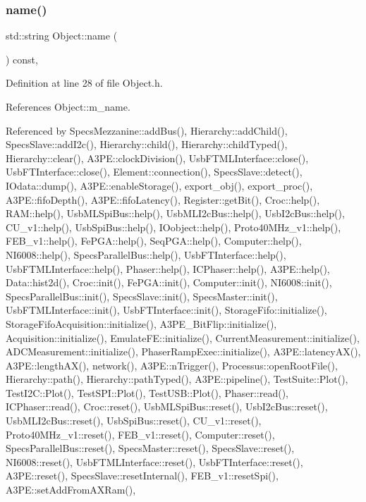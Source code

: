 \subsubsection{\texorpdfstring{name()}{name()}}
{\footnotesize\ttfamily std\+::string Object\+::name (\begin{DoxyParamCaption}{ }\end{DoxyParamCaption}) const\hspace{0.3cm}{\ttfamily [inline]}, {\ttfamily [inherited]}}



Definition at line 28 of file Object.\+h.



References Object\+::m\+\_\+name.



Referenced by Specs\+Mezzanine\+::add\+Bus(), Hierarchy\+::add\+Child(), Specs\+Slave\+::add\+I2c(), Hierarchy\+::child(), Hierarchy\+::child\+Typed(), Hierarchy\+::clear(), A3\+P\+E\+::clock\+Division(), Usb\+F\+T\+M\+L\+Interface\+::close(), Usb\+F\+T\+Interface\+::close(), Element\+::connection(), Specs\+Slave\+::detect(), I\+Odata\+::dump(), A3\+P\+E\+::enable\+Storage(), export\+\_\+obj(), export\+\_\+proc(), A3\+P\+E\+::fifo\+Depth(), A3\+P\+E\+::fifo\+Latency(), Register\+::get\+Bit(), Croc\+::help(), R\+A\+M\+::help(), Usb\+M\+L\+Spi\+Bus\+::help(), Usb\+M\+L\+I2c\+Bus\+::help(), Usb\+I2c\+Bus\+::help(), C\+U\+\_\+v1\+::help(), Usb\+Spi\+Bus\+::help(), I\+Oobject\+::help(), Proto40\+M\+Hz\+\_\+v1\+::help(), F\+E\+B\+\_\+v1\+::help(), Fe\+P\+G\+A\+::help(), Seq\+P\+G\+A\+::help(), Computer\+::help(), N\+I6008\+::help(), Specs\+Parallel\+Bus\+::help(), Usb\+F\+T\+Interface\+::help(), Usb\+F\+T\+M\+L\+Interface\+::help(), Phaser\+::help(), I\+C\+Phaser\+::help(), A3\+P\+E\+::help(), Data\+::hist2d(), Croc\+::init(), Fe\+P\+G\+A\+::init(), Computer\+::init(), N\+I6008\+::init(), Specs\+Parallel\+Bus\+::init(), Specs\+Slave\+::init(), Specs\+Master\+::init(), Usb\+F\+T\+M\+L\+Interface\+::init(), Usb\+F\+T\+Interface\+::init(), Storage\+Fifo\+::initialize(), Storage\+Fifo\+Acquisition\+::initialize(), A3\+P\+E\+\_\+\+Bit\+Flip\+::initialize(), Acquisition\+::initialize(), Emulate\+F\+E\+::initialize(), Current\+Measurement\+::initialize(), A\+D\+C\+Measurement\+::initialize(), Phaser\+Ramp\+Exec\+::initialize(), A3\+P\+E\+::latency\+A\+X(), A3\+P\+E\+::length\+A\+X(), network(), A3\+P\+E\+::n\+Trigger(), Processus\+::open\+Root\+File(), Hierarchy\+::path(), Hierarchy\+::path\+Typed(), A3\+P\+E\+::pipeline(), Test\+Suite\+::\+Plot(), Test\+I2\+C\+::\+Plot(), Test\+S\+P\+I\+::\+Plot(), Test\+U\+S\+B\+::\+Plot(), Phaser\+::read(), I\+C\+Phaser\+::read(), Croc\+::reset(), Usb\+M\+L\+Spi\+Bus\+::reset(), Usb\+I2c\+Bus\+::reset(), Usb\+M\+L\+I2c\+Bus\+::reset(), Usb\+Spi\+Bus\+::reset(), C\+U\+\_\+v1\+::reset(), Proto40\+M\+Hz\+\_\+v1\+::reset(), F\+E\+B\+\_\+v1\+::reset(), Computer\+::reset(), Specs\+Parallel\+Bus\+::reset(), Specs\+Master\+::reset(), Specs\+Slave\+::reset(), N\+I6008\+::reset(), Usb\+F\+T\+M\+L\+Interface\+::reset(), Usb\+F\+T\+Interface\+::reset(), A3\+P\+E\+::reset(), Specs\+Slave\+::reset\+Internal(), F\+E\+B\+\_\+v1\+::reset\+Spi(), A3\+P\+E\+::set\+Add\+From\+A\+X\+Ram(), 